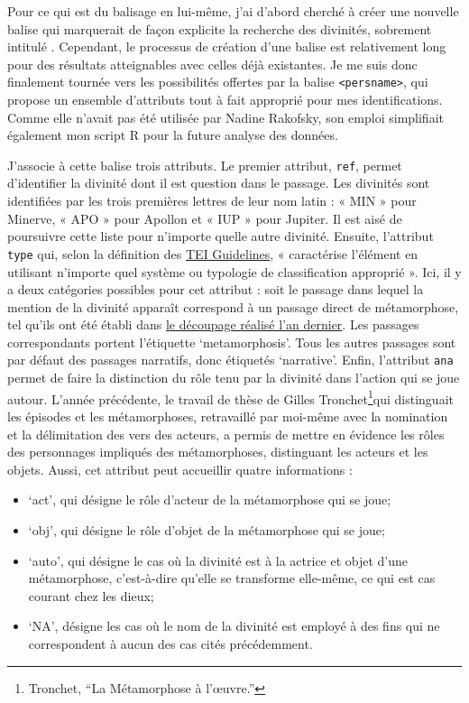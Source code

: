 \documentclass[
  letterpaper,
  DIV=11,
  numbers=noendperiod]{scrreprt}
\providecommand{\tightlist}{%
  \setlength{\itemsep}{0pt}\setlength{\parskip}{0pt}}\usepackage{longtable,booktabs,array}
\begin{document}
Pour ce qui est du balisage en lui-même, j'ai d'abord cherché à créer
une nouvelle balise qui marquerait de façon explicite la recherche des
divinités, sobrement intitulé . Cependant, le processus de création
d'une balise est relativement long pour des résultats atteignables avec
celles déjà existantes. Je me suis donc finalement tournée vers les
possibilités offertes par la balise
\texttt{\textless{}persname\textgreater{}}, qui propose un ensemble
d'attributs tout à fait approprié pour mes identifications. Comme elle
n'avait pas été utilisée par Nadine Rakofsky, son emploi simplifiait
également mon script R pour la future analyse des données.

J'associe à cette balise trois attributs. Le premier attribut,
\texttt{ref}, permet d'identifier la divinité dont il est question dans
le passage. Les divinités sont identifiées par les trois premières
lettres de leur nom latin : « MIN » pour Minerve, « APO » pour Apollon
et « IUP » pour Jupiter. Il est aisé de poursuivre cette liste pour
n'importe quelle autre divinité. Ensuite, l'attribut \texttt{type} qui,
selon la définition des
\href{https://www.tei-c.org/release/doc/tei-p5-doc/fr/html/ref-persName.html}{TEI
Guidelines}, « caractérise l'élément en utilisant n'importe quel système
ou typologie de classification approprié ». Ici, il y a deux catégories
possibles pour cet attribut : soit le passage dans lequel la mention de
la divinité apparaît correspond à un passage direct de métamorphose, tel
qu'ils ont été établi dans
\href{https://docs.google.com/spreadsheets/d/1n_TWKsEPywmv3aVzptd-_cRNn-tIxXZQ3tHtt0w_TJE/edit?gid=2010180086\#gid=2010180086}{le
découpage réalisé l'an dernier}. Les passages correspondants portent
l'étiquette `metamorphosis'. Tous les autres passages sont par défaut
des passages narratifs, donc étiquetés `narrative'. Enfin, l'attribut
\texttt{ana} permet de faire la distinction du rôle tenu par la divinité
dans l'action qui se joue autour. L'année précédente, le travail de
thèse de Gilles Tronchet\footnote{Tronchet, {``La Métamorphose à
  l'œuvre.''}}qui distinguait les épisodes et les métamorphoses,
retravaillé par moi-même avec la nomination et la délimitation des vers
des acteurs, a permis de mettre en évidence les rôles des personnages
impliqués des métamorphoses, distinguant les acteurs et les objets.
Aussi, cet attribut peut accueillir quatre informations :

\begin{itemize}
\tightlist
\item
  `act', qui désigne le rôle d'acteur de la métamorphose qui se joue;
\item
  `obj', qui désigne le rôle d'objet de la métamorphose qui se joue;
\item
  `auto', qui désigne le cas où la divinité est à la actrice et objet
  d'une métamorphose, c'est-à-dire qu'elle se transforme elle-même, ce
  qui est cas courant chez les dieux;
\item
  `NA', désigne les cas où le nom de la divinité est employé à des fins
  qui ne correspondent à aucun des cas cités précédemment.
\end{itemize}
\end{document}
